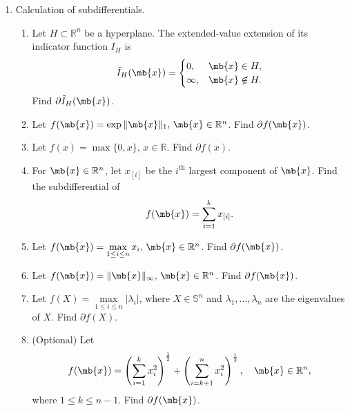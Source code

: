 \begin{exercise}[Subdifferentials]
  \begin{enumerate}
    \item Calculation of subdifferentials.
      \begin{enumerate}
        \item Let $H\subset\mathbb{R}^n$ be a hyperplane. The extended-value extension of its indicator function $I_H$ is
          \begin{align*}
            \tilde{I}_H(\mb{x})=\begin{cases}
                                  0,      & \mb{x}\in H,      \\
                                  \infty, & \mb{x}\not\in H.
                                \end{cases}
          \end{align*}
          Find $\partial \tilde{I}_H(\mb{x})$.
          
        \item Let $f(\mb{x})=\exp{\|\mb{x}\|_1},\, \mb{x}\in\mathbb{R}^n$. Find $\partial f(\mb{x})$.
          
        \item Let $f(x)=\max\{0,x\},\,x\in\mathbb{R}$. Find $\partial f(x)$.
          
        \item For $\mb{x}\in\mathbb{R}^n$, let $x_{[i]}$ be the $i^{\text{th}}$ largest component of $\mb{x}$. Find the subdifferential of
          \begin{align*}
            f(\mb{x})=\sum_{i=1}^k x_{[i]}.
          \end{align*}
          
        \item Let $f(\mb{x})=\max\limits_{1\le i\le n} x_i,\, \mb{x}\in\mathbb{R}^n$. Find $\partial f(\mb{x})$.
          
        \item Let $f(\mb{x})=\|\mb{x}\|_\infty,\, \mb{x}\in\mathbb{R}^n$. Find $\partial f(\mb{x})$.
          
          
        \item Let $f(X)=\max\limits_{1\le i\le n}|\lambda_i|$, where $X\in \mathbb{S}^n$ and $\lambda_1,\dots,\lambda_n$ are the eigenvalues of $X$. Find $\partial f(X)$.
          
        \item (Optional) Let
          \begin{align*}
            f(\mb{x})=\left(\sum\limits_{i=1}^k x_i^2\right)^{\frac{1}{2}}+\left(\sum\limits_{i=k+1}^n x_i^2\right)^{\frac{1}{2}},\quad \mb{x}\in\mathbb{R}^n,
          \end{align*}
          where $1\le k\le n-1$. Find $\partial f(\mb{x})$.
          

\end{enumerate}
\end{enumerate}
\end{exercise}
